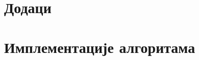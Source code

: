 \documentclass[a4paper, 12pt, ngerman]{article}
\let\oldsection\section
\renewcommand\section{\clearpage\oldsection}
\begin{document}
\appendix
{}
\section*{Додаци}
\section{Имплементације алгоритама}


\pagebreak


\pagebreak


\pagebreak


\pagebreak


\pagebreak


\pagebreak


\pagebreak


\pagebreak
\end{document}
